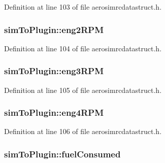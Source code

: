 Definition at line 103 of file aerosimrcdatastruct.\-h.

\hypertarget{group___aero_sim_r_c_ga2fa372d547f9f33642415f454bccf402}{
\subsubsection[{eng2\-R\-P\-M}]{ sim\-To\-Plugin\-::eng2\-R\-P\-M}}\label{group___aero_sim_r_c_ga2fa372d547f9f33642415f454bccf402}


Definition at line 104 of file aerosimrcdatastruct.\-h.

\hypertarget{group___aero_sim_r_c_ga12d0b07a1f43644fa7b16c0b53409ef9}{
\subsubsection[{eng3\-R\-P\-M}]{ sim\-To\-Plugin\-::eng3\-R\-P\-M}}\label{group___aero_sim_r_c_ga12d0b07a1f43644fa7b16c0b53409ef9}


Definition at line 105 of file aerosimrcdatastruct.\-h.

\hypertarget{group___aero_sim_r_c_gac7d5d72d3237905c99ee5b63859e7df3}{
\subsubsection[{eng4\-R\-P\-M}]{ sim\-To\-Plugin\-::eng4\-R\-P\-M}}\label{group___aero_sim_r_c_gac7d5d72d3237905c99ee5b63859e7df3}


Definition at line 106 of file aerosimrcdatastruct.\-h.

\hypertarget{group___aero_sim_r_c_gae96b24ccedba1107673cdc5889815f58}{
\subsubsection[{fuel\-Consumed}]{ sim\-To\-Plugin\-::fuel\-Consumed}}\label{group___aero_sim_r_c_gae96b24ccedba1107673cdc5889815f58}


